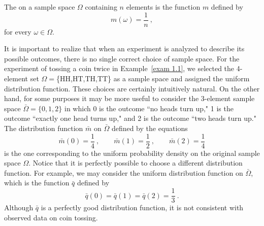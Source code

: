 \begin{definition}\label{def 1.3} 
The  on a sample space $\Omega$ 
containing $n$ elements is the function $m$ defined by
$$
m(\omega) = \frac1n\ ,
$$
for every $\omega \in \Omega$.
\end{definition}
It is important to realize that when an experiment is analyzed to describe
its
possible outcomes, there is no single correct choice of sample space.  For
the
experiment of tossing a coin twice in Example~\ref{exam 1.1},
we selected the 4-element set $\Omega = $\{HH,HT,TH,TT\} as a sample space
and
assigned the uniform distribution function.  These choices are certainly
intuitively natural.  On the other hand, for some purposes it may be more
useful
to consider the 3-element sample space $\bar\Omega = \{0,1,2\}$ in which
0
is the outcome ``no heads turn up," 1 is the outcome ``exactly one head
turns up," and 2 is the outcome ``two heads turn up."  The distribution function
$\bar m$ on $\bar\Omega$ defined by the equations
$$
\bar m(0) = \frac14\ ,\qquad \bar m(1) = \frac12\ , \qquad \bar
m(2) =
\frac14
$$
is the one corresponding to the uniform probability density on the original
sample space $\Omega$.  Notice that it is perfectly possible to choose a
different distribution function.  For example, we may consider the uniform
distribution function on $\bar\Omega$, which is the function $\bar q$
defined by
$$
\bar q(0) = \bar q(1) = \bar q(2) = \frac13\ .
$$
Although $\bar q$ is a perfectly good distribution function, it is not
consistent with observed data on coin tossing.
